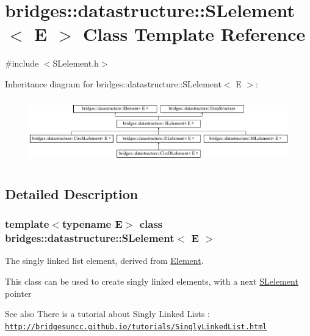 \hypertarget{classbridges_1_1datastructure_1_1_s_lelement}{}\section{bridges\+:\+:datastructure\+:\+:S\+Lelement$<$ E $>$ Class Template Reference}
\label{classbridges_1_1datastructure_1_1_s_lelement}


{\ttfamily \#include $<$S\+Lelement.\+h$>$}

Inheritance diagram for bridges\+:\+:datastructure\+:\+:S\+Lelement$<$ E $>$\+:\begin{figure}[H]
\begin{center}
\leavevmode
\includegraphics[height=2.839037cm]{classbridges_1_1datastructure_1_1_s_lelement}
\end{center}
\end{figure}


\subsection{Detailed Description}
\subsubsection*{template$<$typename E$>$\newline
class bridges\+::datastructure\+::\+S\+Lelement$<$ E $>$}

The singly linked list element, derived from \hyperlink{classbridges_1_1datastructure_1_1_element}{Element}. 

This class can be used to create singly linked elements, with a next \hyperlink{classbridges_1_1datastructure_1_1_s_lelement}{S\+Lelement} pointer

\begin{DoxySeeAlso}{See also}
There is a tutorial about Singly Linked Lists \+: \href{http://bridgesuncc.github.io/tutorials/SinglyLinkedList.html}{\tt http\+://bridgesuncc.\+github.\+io/tutorials/\+Singly\+Linked\+List.\+html}
\end{DoxySeeAlso}


